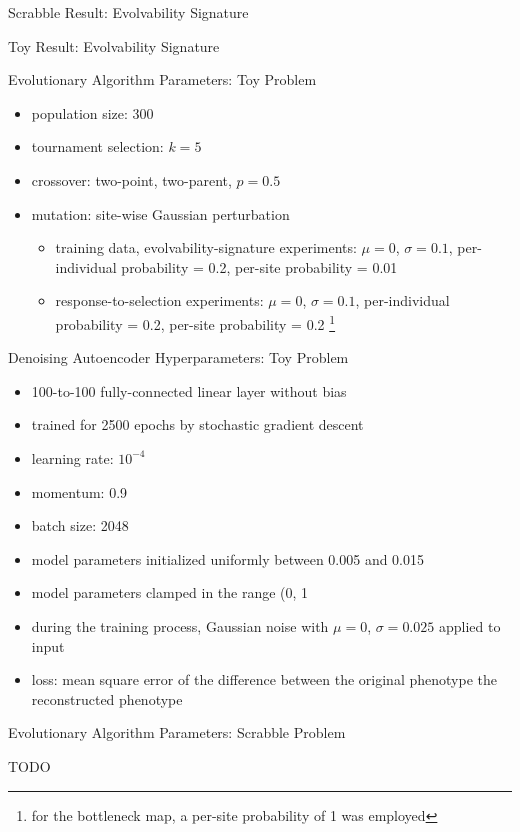 \begin{frame}{Scrabble Result: Evolvability Signature}



\end{frame}

\begin{frame}{Toy Result: Evolvability Signature}



\end{frame}

\begin{frame}{Evolutionary Algorithm Parameters: Toy Problem}

\begin{itemize}
\item population size: 300
\item tournament selection: $k = 5$
\item crossover: two-point, two-parent, $p = 0.5$
\item mutation: site-wise Gaussian perturbation
\begin{itemize}
\item training data, evolvability-signature experiments: $\mu = 0$, $\sigma = 0.1$, per-individual
probability = 0.2, per-site probability = 0.01
\item response-to-selection experiments: $\mu = 0$, $\sigma = 0.1$, per-individual probability = 0.2, per-site probability = 0.2 %
\footnote{for the bottleneck map, a per-site probability of 1 was employed}
\end{itemize}
\end{itemize}

\end{frame}

\begin{frame}{Denoising Autoencoder Hyperparameters: Toy Problem}

\begin{itemize}
\item 100-to-100 fully-connected linear layer without bias
\item trained for 2500 epochs by stochastic gradient descent
\item learning rate: $10^{−4}$
\item momentum: 0.9
\item batch size: 2048
\item model parameters initialized uniformly between 0.005 and 0.015
\item model parameters clamped in the range (0, 1
\item during the training process, Gaussian
  noise with $\mu = 0$, $\sigma = 0.025$ applied to input
\item loss: mean square error of the difference between the original phenotype the reconstructed phenotype
\end{itemize}

\end{frame}

\begin{frame}{Evolutionary Algorithm Parameters: Scrabble Problem}

TODO

\end{frame}
